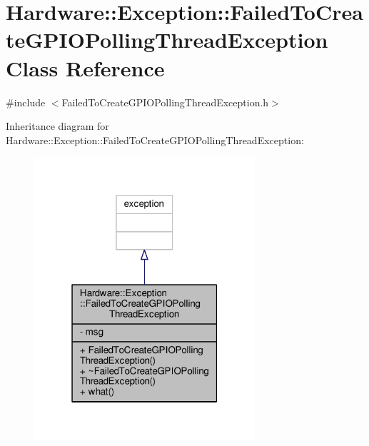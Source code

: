 \hypertarget{class_hardware_1_1_exception_1_1_failed_to_create_g_p_i_o_polling_thread_exception}{}\section{Hardware\+:\+:Exception\+:\+:Failed\+To\+Create\+G\+P\+I\+O\+Polling\+Thread\+Exception Class Reference}
\label{class_hardware_1_1_exception_1_1_failed_to_create_g_p_i_o_polling_thread_exception}


{\ttfamily \#include $<$Failed\+To\+Create\+G\+P\+I\+O\+Polling\+Thread\+Exception.\+h$>$}



Inheritance diagram for Hardware\+:\+:Exception\+:\+:Failed\+To\+Create\+G\+P\+I\+O\+Polling\+Thread\+Exception\+:\nopagebreak
\begin{figure}[H]
\begin{center}
\leavevmode
\includegraphics[width=232pt]{class_hardware_1_1_exception_1_1_failed_to_create_g_p_i_o_polling_thread_exception__inherit__graph}
\end{center}
\end{figure}


